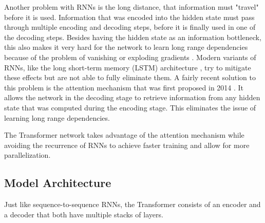 Another problem with RNNs is the long distance, that information must "travel" before it is used. %
Information that was encoded into the hidden state must pass through multiple encoding and decoding steps, before it is finally used in one of the decoding steps.
Besides having the hidden state as an information bottleneck, this also makes it very hard for the network to learn long range dependencies because of the problem of vanishing or exploding gradients \cite{Hochreiter01gradientflow}. %
Modern variants of RNNs, like the long short-term memory (LSTM) architecture \cite{Hochreiter1997}, try to mitigate these effects but are not able to fully eliminate them.
A fairly recent solution to this problem is the attention mechanism that was first proposed in 2014 \cite{1409.0473}.
It allows the network in the decoding stage to retrieve information from any hidden state that was computed during the encoding stage.
This eliminates the issue of learning long range dependencies.

The Transformer network takes advantage of the attention mechanism while avoiding the recurrence of RNNs to achieve faster training and allow for more parallelization.

\subsection{Model Architecture}\label{ssec:transformer-model-architecture}

Just like sequence-to-sequence RNNs, the Transformer consists of an encoder and a decoder that both have multiple stacks of layers.

